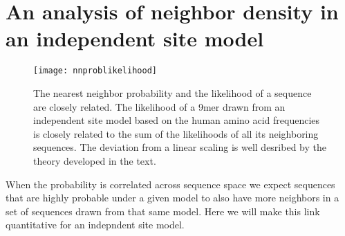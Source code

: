 \section{An analysis of neighbor density in an independent site model}

\begin{figure}
    \texttt{[image: nnproblikelihood]}
    \caption{The nearest neighbor probability and the likelihood of a sequence are closely related. The likelihood of a 9mer drawn from an independent site model based on the human amino acid frequencies is closely related to the sum of the likelihoods of all its neighboring sequences. The deviation from a linear scaling is well desribed by the theory developed in the text. 
    \label{fignnproblikelihood}
    }
\end{figure}

When the probability is correlated across sequence space we expect sequences that are highly probable under a given model to also have more neighbors in a set of sequences drawn from that same model. Here we will make this link quantitative for an indepndent site model.

